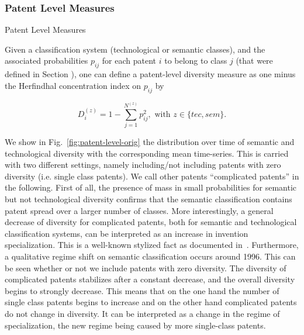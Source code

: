 
\subsubsection*{Patent Level Measures}{Patent Level Measures}  \label{subsec:orig-gene}

Given a classification system (technological or semantic classes), and the associated probabilities $p_{ij}$ for each patent $i$ to belong to class $j$ (that were defined in Section ), one can define a patent-level diversity measure as one minus the Herfindhal concentration index on $p_{ij}$  by

\[
D_i^{(z)} = 1 - \sum_{j =1}^{N^{(z)}} {p_{ij}^2}, \text{ with } z \in \{tec, sem\}.
\]

We show in Fig.~\ref{fig:patent-level-orig} the distribution over time of semantic and technological diversity with the corresponding mean time-series. This is carried with two different settings, namely including/not including patents with zero diversity (i.e. single class patents). We call other patents ``complicated patents'' in the following. First of all, the presence of mass in small probabilities for semantic but not technological diversity confirms that the semantic classification contains patent spread over a larger number of classes. More interestingly, a general decrease of diversity for complicated patents, both for semantic and technological classification systems, can be interpreted as an increase in invention specialization. This is a well-known stylized fact as documented in~\cite{ARCHIBUGI199279}. Furthermore, a qualitative regime shift on semantic classification occurs around 1996. This can be seen whether or not we include patents with zero diversity. The diversity of complicated patents stabilizes after a constant decrease, and the overall diversity begins to strongly decrease. This means that on the one hand the number of single class patents begins to increase and on the other hand complicated patents do not change in diversity. It can be interpreted as a change in the regime of specialization, the new regime being caused by more single-class patents.

